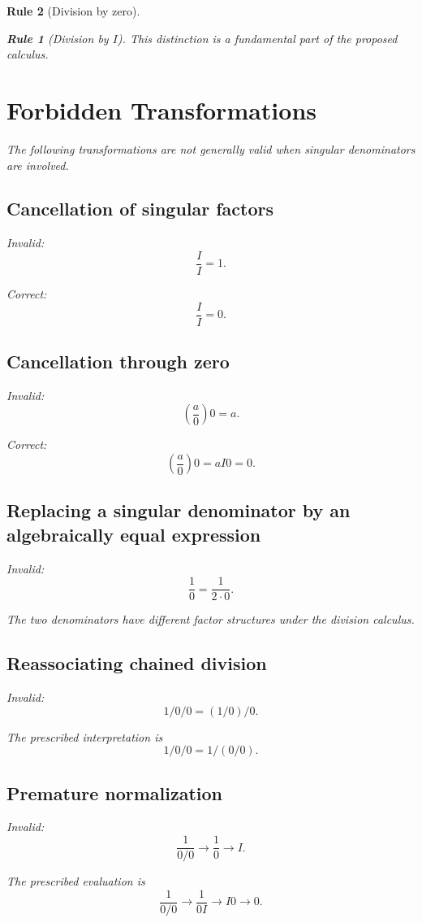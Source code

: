 \documentclass[11pt,a4paper]{article}
\newtheorem{rulethm}{Rule}[section]
\begin{document}
\begin{rulethm}[Division by zero]
\begin{rulethm}[Division by $I$]
This distinction is a fundamental part of the proposed calculus.

\section{Forbidden Transformations}

The following transformations are not generally valid when singular
denominators are involved.

\subsection{Cancellation of singular factors}

Invalid:
\[
\frac{I}{I}=1.
\]

Correct:
\[
\frac{I}{I}=0.
\]

\subsection{Cancellation through zero}

Invalid:
\[
\left(\frac{a}{0}\right)0=a.
\]

Correct:
\[
\left(\frac{a}{0}\right)0=aI0=0.
\]

\subsection{Replacing a singular denominator by an algebraically equal
expression}

Invalid:
\[
\frac{1}{0}=\frac{1}{2\cdot0}.
\]

The two denominators have different factor structures under the division
calculus.

\subsection{Reassociating chained division}

Invalid:
\[
1/0/0=(1/0)/0.
\]

The prescribed interpretation is
\[
1/0/0=1/(0/0).
\]

\subsection{Premature normalization}

Invalid:
\[
\frac{1}{0/0}
\rightarrow
\frac10
\rightarrow I.
\]

The prescribed evaluation is
\[
\frac{1}{0/0}
\rightarrow
\frac{1}{0I}
\rightarrow
I0
\rightarrow0.
\]


\end{rulethm}
\end{rulethm}
\end{document}
